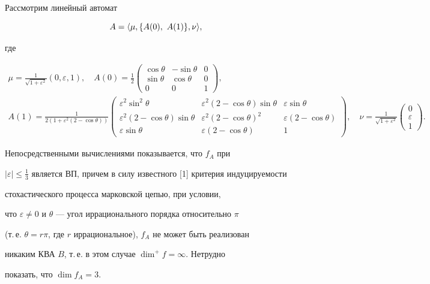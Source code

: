 \begin{pf}


Рассмотрим линейный автомат


$$


A=\la\mu,\{A(0),\ A(1)\},\nu\ra,


$$


где


\begin{gather*}


\mu=\frac{1}{\sqrt{1+\varepsilon^2}}(0,\varepsilon,1),\quad


A(0)=\frac{1}{2}


\begin{pmatrix}


\cos\theta & -\sin\theta & 0 \\


\sin\theta & \cos\theta & 0 \\


0 & 0 & 1


\end{pmatrix}


,\\


A(1)=\frac{1}{2(1+\varepsilon^2(2-\cos\theta))}


\begin{pmatrix}


\varepsilon^2\sin^2\theta &


\varepsilon^2(2-\cos\theta)\sin\theta & \varepsilon\sin\theta \\


\varepsilon^2(2-\cos\theta)\sin\theta &


\varepsilon^2(2-\cos\theta)^2 &


\varepsilon(2-\cos\theta)\\


\varepsilon\sin\theta & \varepsilon(2-\cos\theta) & 1


\end{pmatrix}


,\quad \nu=\frac{1}{\sqrt{1+\varepsilon^2}}


\begin{pmatrix}0 \\ \varepsilon \\ 1 \end{pmatrix}.


\end{gather*}


Непосредственными вычислениями показывается, что $f_A$ при


$|\varepsilon|\le\frac{1}{3}$ является ВП, причем в силу известного [1] критерия индуцируемости 


стохастического процесса марковской цепью, при условии, 


что $\varepsilon\ne0$ и $\theta$ --- угол иррационального порядка относительно $\pi$


(т.\,е. $\theta=r\pi$, где $r$ иррациональное), $f_A$ не может быть реализован 


никаким КВА $B$, т.\,е. в этом случае $\dim^+f=\infty$. Нетрудно


показать, что $\dim f_A=3$.


\end{pf}
